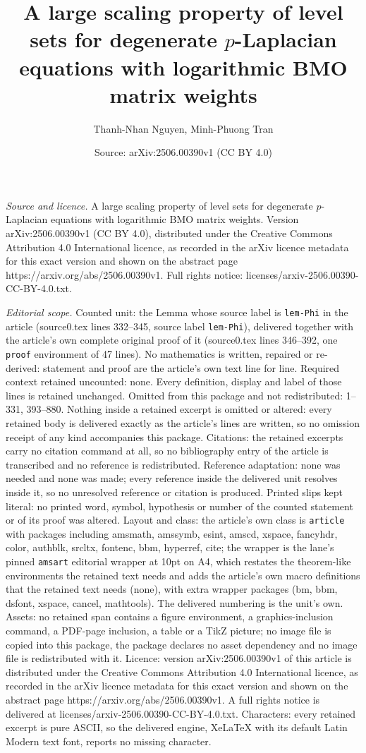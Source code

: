 \documentclass[10pt,a4paper]{amsart}
\title[A large scaling property of level sets for degenerate $p$-La]{A large scaling property of level sets for degenerate $p$-Laplacian equations with logarithmic BMO matrix weights}
\author{Thanh-Nhan Nguyen, Minh-Phuong Tran}
\date{Source: arXiv:2506.00390v1 (CC BY 4.0)}
\begin{document}
\maketitle

\noindent\emph{Source and licence.} A large scaling property of level sets for degenerate $p$-Laplacian equations with logarithmic BMO matrix weights. Version arXiv:2506.00390v1 (CC BY 4.0), distributed under the Creative Commons Attribution 4.0 International licence, as recorded in the arXiv licence metadata for this exact version and shown on the abstract page https://arxiv.org/abs/2506.00390v1. Full rights notice: licenses/arxiv-2506.00390-CC-BY-4.0.txt.\par\smallskip

\noindent\textit{Editorial scope.} Counted unit: the Lemma whose source label is \texttt{lem-Phi} in the article (source0.tex lines 332--345, source label \texttt{lem-Phi}), delivered together with the article's own complete original proof of it (source0.tex lines 346--392, one \texttt{proof} environment of 47 lines). No mathematics is written, repaired or re-derived: statement and proof are the article's own text line for line. Required context retained uncounted: none. Every definition, display and label of those lines is retained unchanged. Omitted from this package and not redistributed: 1--331, 393--880. Nothing inside a retained excerpt is omitted or altered: every retained body is delivered exactly as the article's lines are written, so no omission receipt of any kind accompanies this package. Citations: the retained excerpts carry no citation command at all, so no bibliography entry of the article is transcribed and no reference is redistributed. Reference adaptation: none was needed and none was made; every reference inside the delivered unit resolves inside it, so no unresolved reference or citation is produced. Printed slips kept literal: no printed word, symbol, hypothesis or number of the counted statement or of its proof was altered. Layout and class: the article's own class is \texttt{article} with packages including amsmath, amssymb, esint, amscd, xspace, fancyhdr, color, authblk, srcltx, fontenc, bbm, hyperref, cite; the wrapper is the lane's pinned \texttt{amsart} editorial wrapper at 10pt on A4, which restates the theorem-like environments the retained text needs and adds the article's own macro definitions that the retained text needs (none), with extra wrapper packages (bm, bbm, dsfont, xspace, cancel, mathtools). The delivered numbering is the unit's own. Assets: no retained span contains a figure environment, a graphics-inclusion command, a PDF-page inclusion, a table or a TikZ picture; no image file is copied into this package, the package declares no asset dependency and no image file is redistributed with it. Licence: version arXiv:2506.00390v1 of this article is distributed under the Creative Commons Attribution 4.0 International licence, as recorded in the arXiv licence metadata for this exact version and shown on the abstract page https://arxiv.org/abs/2506.00390v1. A full rights notice is delivered at licenses/arxiv-2506.00390-CC-BY-4.0.txt. Characters: every retained excerpt is pure ASCII, so the delivered engine, XeLaTeX with its default Latin Modern text font, reports no missing character.
\end{document}
